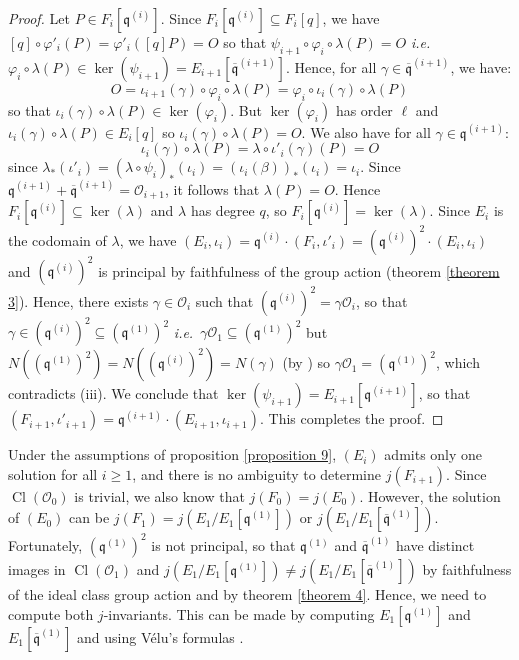 \documentclass[a4paper,10pt]{report}
\theoremstyle{definition}
\theoremstyle{plain}
\theoremstyle{definition}
\newcommand{\ie}{\emph{i.e.}\ }
\newcommand{\mO}{\mathcal{O}}
\renewcommand{\(}{\left(}
\renewcommand{\)}{\right)}
\newcommand{\mf}[1]{\mathfrak{#1}}
\newcommand{\mfq}{\mathfrak{q}}
\DeclareMathOperator{\Cl}{Cl}
\begin{document}
\begin{proof}
Let $P\in F_i[\mfq^{(i)}]$. Since $F_i[\mfq^{(i)}]\subseteq F_i[q]$, we have $[q]\circ\varphi'_i(P)=\varphi'_i([q]P)=O$ so that $\psi_{i+1}\circ\varphi_i\circ\lambda(P)=O$ \ie  $\varphi_i\circ\lambda(P)\in\ker(\psi_{i+1})=E_{i+1}[\overline{\mfq}^{(i+1)}]$. Hence, for all $\gamma\in\overline{\mfq}^{(i+1)}$, we have:
\[O=\iota_{i+1}(\gamma)\circ\varphi_i\circ\lambda(P)=\varphi_i\circ\iota_i(\gamma)\circ\lambda(P)\]
so that $\iota_i(\gamma)\circ\lambda(P)\in \ker(\varphi_i)$. But $\ker(\varphi_i)$ has order $\ell$ and $\iota_i(\gamma)\circ\lambda(P)\in E_i[q]$ so $\iota_i(\gamma)\circ\lambda(P)=O$. We also have for all $\gamma\in\mfq^{(i+1)}$:
\[\iota_i(\gamma)\circ\lambda(P)=\lambda\circ\iota'_i(\gamma)(P)=O\]
since $\lambda_*(\iota'_i)=(\lambda\circ\psi_i)_*(\iota_i)=(\iota_i(\beta))_*(\iota_i)=\iota_i$. Since $\mfq^{(i+1)}+\overline{\mfq}^{(i+1)}=\mO_{i+1}$, it follows that $\lambda(P)=O$. Hence $F_i[\mfq^{(i)}]\subseteq\ker(\lambda)$ and $\lambda$ has degree $q$, so $F_i[\mfq^{(i)}]=\ker(\lambda)$. Since $E_i$ is the codomain of $\lambda$, we have $(E_i,\iota_i)=\mfq^{(i)}\cdot (F_i,\iota'_i)=(\mfq^{(i)})^2\cdot (E_i,\iota_i)$ and $(\mfq^{(i)})^2$ is principal by faithfulness of the group action (theorem \ref{theorem 3}). Hence, there exists $\gamma\in\mO_i$ such that $(\mfq^{(i)})^2=\gamma\mO_i$, so that $\gamma\in (\mfq^{(i)})^2\subseteq (\mfq^{(1)})^2$ \ie $\gamma\mO_1\subseteq (\mfq^{(1)})^2$ but $N((\mfq^{(1)})^2)=N((\mfq^{(i)})^2)=N(\gamma)$ (by \cite[proposition 7.20.(i)]{Cox}) so $\gamma\mO_1= (\mfq^{(1)})^2$, which contradicts (iii).  We conclude that $\ker(\psi_{i+1})=E_{i+1}[\mfq^{(i+1)}]$, so that $(F_{i+1},\iota'_{i+1})=\mf{q}^{(i+1)}\cdot(E_{i+1},\iota_{i+1})$. This completes the proof.
\end{proof}

Under the assumptions of proposition \ref{proposition 9},  $(E_i)$ admits only one solution for all $i\geq 1$, and there is no ambiguity to determine $j(F_{i+1})$. Since $\Cl(\mO_0)$ is trivial, we also know that $j(F_0)=j(E_0)$. However, the solution of $(E_0)$ can be $j(F_1)=j(E_1/E_1[\mfq^{(1)}])$ or $j(E_1/E_1[\overline{\mfq}^{(1)}])$. Fortunately, $(\mfq^{(1)})^2$ is not principal, so that $\mfq^{(1)}$ and $\overline{\mfq}^{(1)}$ have distinct images in $\Cl(\mO_1)$ and $j(E_1/E_1[\mfq^{(1)}])\neq j(E_1/E_1[\overline{\mfq}^{(1)}])$ by faithfulness of the ideal class group action and by theorem \ref{theorem 4}.  Hence, we need to compute both $j$-invariants. This can be made by computing $E_1[\mfq^{(1)}]$ and $E_1[\overline{\mfq}^{(1)}]$ and using V\'{e}lu's formulas \cite{Velu}. 
\end{document}

